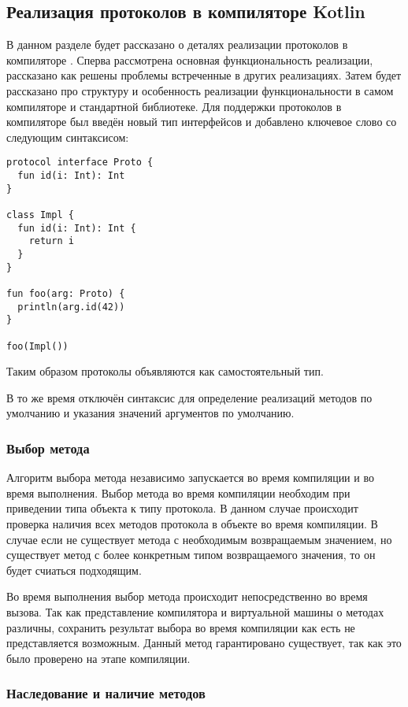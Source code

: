 \subsection{Реализация протоколов в компиляторе Kotlin}

В данном разделе будет рассказано о деталях реализации протоколов в компиляторе . Сперва рассмотрена основная функциональность реализации, рассказано как решены проблемы встреченные в других реализациях. Затем будет рассказано про структуру и особенность реализации функциональности в самом компиляторе и стандартной библиотеке.
Для поддержки протоколов в компиляторе был введён новый тип интерфейсов и добавлено ключевое слово  со следующим синтаксисом:

\begin{verbatim}
protocol interface Proto {
  fun id(i: Int): Int
}

class Impl {
  fun id(i: Int): Int {
    return i
  }
}

fun foo(arg: Proto) {
  println(arg.id(42))
}

foo(Impl())
\end{verbatim}

Таким образом протоколы объявляются как самостоятельный тип.

В то же время отключён синтаксис для определение реализаций методов по умолчанию и указания значений аргументов по умолчанию.

\subsubsection{Выбор метода}

Алгоритм выбора метода независимо запускается во время компиляции и во время выполнения. Выбор метода во время компиляции необходим при приведении типа объекта к типу протокола. В данном случае происходит проверка наличия всех методов протокола в объекте во время компиляции. В случае если не существует метода с необходимым возвращаемым значением, но существует метод с более конкретным типом возвращаемого значения, то он будет счиаться подходящим.

Во время выполнения выбор метода происходит непосредственно во время вызова. Так как представление компилятора и виртуальной машины о методах различны, сохранить результат выбора во время компиляции как есть не представляется возможным. Данный метод гарантировано существует, так как это было проверено на этапе компиляции.

\subsubsection{Наследование и наличие методов}


